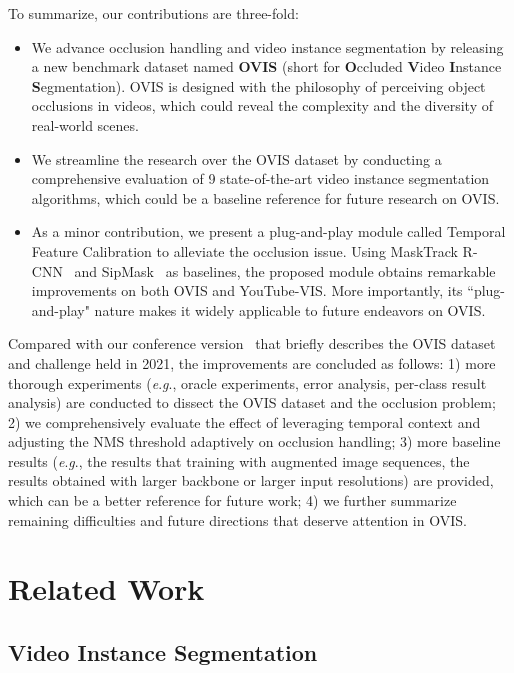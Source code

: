 \documentclass[twocolumn]{svjour3}          \smartqed  \usepackage{graphicx}
\newcommand{\eg}{\textit{e}.\textit{g}.}
\def\myTextColor{\textcolor[rgb]{0, 0, 0}}
\begin{document}
\begin{sloppypar}
To summarize, our contributions are three-fold:
\begin{itemize}
\item We advance occlusion handling and video instance segmentation by releasing a new benchmark dataset named \textbf{OVIS} (short for \textbf{O}ccluded \textbf{V}ideo \textbf{I}nstance \textbf{S}egmentation). OVIS is designed with the philosophy of perceiving object occlusions in videos, which could reveal the complexity and the diversity of real-world scenes.
\item We streamline the research over the OVIS dataset by conducting a comprehensive evaluation of 9 state-of-the-art video instance segmentation algorithms, which could be a baseline reference for future research on OVIS.
\item \myTextColor{As a minor contribution, we present a plug-and-play module called Temporal Feature Calibration to alleviate the occlusion issue. Using MaskTrack R-CNN~\cite{youtube_vis} and SipMask~\cite{sipmask} as baselines, the proposed module obtains remarkable improvements on both OVIS and YouTube-VIS. More importantly, its ``plug-and-play" nature makes it widely applicable to future endeavors on OVIS.}
\end{itemize}

\myTextColor{Compared with our conference version~\cite{ovis_nips} that briefly describes the OVIS dataset and challenge held in 2021, the improvements are concluded as follows: 1) more thorough experiments (\eg, oracle experiments, error analysis, per-class result analysis) are conducted to dissect the OVIS dataset and the occlusion problem; 2) we comprehensively evaluate the effect of leveraging temporal context and adjusting the NMS threshold adaptively on occlusion handling; 3) more baseline results (\eg, the results that training with augmented image sequences, the results obtained with larger backbone or larger input resolutions) are provided, which can be a better reference for future work; 4) we further summarize remaining difficulties and future directions that deserve attention in OVIS.}

\section{Related Work}

\subsection{Video Instance Segmentation}


\end{sloppypar}
\end{document}
